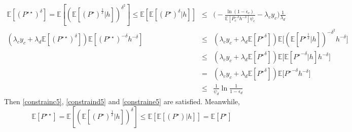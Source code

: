 \documentclass[12pt, draftclsnofoot, journal, letterpaper, onecolumn]{IEEEtran}
\begin{document}
\begin{IEEEproof}
\begin{eqnarray*}
\mathbb{E}[(P^{\star\star})^\delta]=\mathbb{E}[(\mathbb{E}[(P^{\star})^{\frac{1}{\delta}}|h])^{\delta^2}]\leq\mathbb{E}[\mathbb{E}[(P^{\star})^{\delta}|h]]&\leq& \bigg(-\frac{\ln(1-\epsilon_c)}{\mathbb{E}[P_c^{-\delta}h^{-\delta}]\psi_c}-\lambda_cy_c\bigg)\frac{1}{\lambda_d}\\
(\lambda_cy_c+\lambda_d\mathbb{E}[({P^{\star\star}})^\delta])\mathbb{E}[({P^{\star\star}})^{-\delta}h^{-\delta}]
&\leq&(\lambda_cy_c+\lambda_d\mathbb{E}[{P^{\star}}^\delta])\mathbb{E}\big[(\mathbb{E}[{P^\star}^{\frac{1}{\delta}}|h])^{-\delta^2}h^{-\delta}\big]\\
&\leq&(\lambda_cy_c+\lambda_d\mathbb{E}[{P^{\star}}^\delta])\mathbb{E}\big[\mathbb{E}[{P^\star}^{-\delta}|h]h^{-\delta}\big]\\
&=&(\lambda_cy_c+\lambda_d\mathbb{E}[{P^{\star}}^\delta])\mathbb{E}\big[{P^\star}^{-\delta}h^{-\delta}\big]\\
&\leq&\frac{1}{\psi_d}\ln\frac{1}{1-\epsilon_d}
\end{eqnarray*}
Then \eqref{constrainc5}, \eqref{constraind5} and \eqref{constraine5} are satisfied.
Meanwhile,
\begin{equation*}
\mathbb{E}[P^{\star\star}]=\mathbb{E}[(\mathbb{E}[(P^{\star})^{\frac{1}{\delta}}|h])^{\delta}]\leq\mathbb{E}[\mathbb{E}[(P^{\star})|h]]=\mathbb{E}[P^{\star}]
\end{equation*}
\end{IEEEproof}









\end{document}
